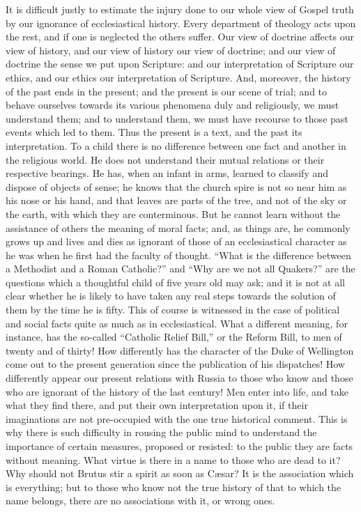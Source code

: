 It is difficult justly to estimate the injury
done to our whole view of Gospel truth by our ignorance of
ecclesiastical history. Every department of theology acts upon the
rest, and if one is neglected the others suffer. Our view of doctrine
affects our view of history, and our view of history our view of
doctrine; and our view of doctrine the sense we put upon Scripture:
and our interpretation of Scripture our ethics, and our ethics our
interpretation of Scripture. And, moreover, the history of the past
ends in the present; and the present is our scene of trial; and to
behave ourselves towards its various phenomena duly and religiously,
we must understand them; and to understand them, we must have recourse
to those past events which led to them. Thus the present is a text,
and the past its interpretation. To a child there is no difference
between one fact and another in the religious world. He does not
understand their mutual relations or their respective bearings. He
has, when an infant in arms, learned to classify and dispose of
objects of sense; he knows that the church spire is not so near him as
his nose or his hand, and that leaves are parts of the tree, and not
of the sky or the earth, with which they are conterminous. But he
cannot learn without the assistance of others the meaning of moral
facts; and, as things are, he commonly grows up and lives and dies as
ignorant of those of an ecclesiastical character as he was when he
first had the faculty of thought. ``What is the difference between a
Methodist and a Roman Catholic?'' and ``Why are we not all Quakers?'' are
the questions which a thoughtful child of five years old may ask; and
it is not at all clear whether he is likely to have taken any
real steps towards the solution of them by the time he is fifty. This
of course is witnessed in the case of political and social facts quite
as much as in ecclesiastical. What a different meaning, for instance,
has the so-called ``Catholic Relief Bill,'' or the Reform Bill, to men
of twenty and of thirty! How differently has the character of the Duke
of Wellington come out to the present generation since the publication
of his dispatches! How differently appear our present relations with
Russia to those who know and those who are ignorant of the history of
the last century! Men enter into life, and take what they find there,
and put their own interpretation upon it, if their imaginations are
not pre-occupied with the one true historical comment. This is why
there is such difficulty in rousing the public mind to understand the
importance of certain measures, proposed or resisted: to the public
they are facts without meaning. What virtue is there in a name to
those who are dead to it? Why should not Brutus stir a spirit as soon
as Cæsar? It is the association which is everything; but to those who
know not the true history of that to which the name belongs, there are
no associations with it, or wrong ones.

